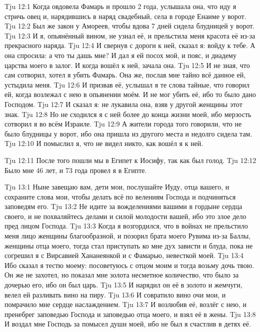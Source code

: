 \vs Tju 12:1
Когда овдовела Фамарь и прошло 2 года, услышала она,
что иду я стричь овец и, нарядившись в наряд свадебный,
села в городе Енаиме у ворот.
\vs Tju 12:2
Был же закон у Амореев, чтобы вдова 7 дней сидела блудницей у ворот.
\vs Tju 12:3
И я, опьянённый вином, не узнал её,
и прельстила меня красота её из-за прекрасного наряда.
\vs Tju 12:4
И свернув с дороги к ней, сказал я: войду к тебе.
А она спросила: а что ты дашь мне?
И дал я ей посох мой, и пояс, и диадему царства моего в залог.
И когда вошёл к ней, зачала она.
\vs Tju 12:5
И не зная, что сам сотворил, хотел я убить Фамарь.
Она же, послав мне тайно всё данное ей, устыдила меня.
\vs Tju 12:6
И призвав её, услышал я те слова тайные, что говорил ей,
когда возлежал с нею в опьянении моём.
И не мог убить её, ибо то было дано Господом.
\vs Tju 12:7
И сказал я: не лукавила она, взяв у другой женщины этот знак.
\vs Tju 12:8
Но не сходился я с ней более до конца жизни моей,
ибо мерзость сотворил я во всём Израиле.
\vs Tju 12:9
А жители города того говорили, что не было блудницы у ворот,
ибо она пришла из другого места и недолго сидела там.
\vs Tju 12:10
И помыслил я, что не видел никто, как вошёл я к ней.

\vs Tju 12:11
После того пошли мы в Египет к Иосифу, так как был голод.
\vs Tju 12:12
Было мне 46 лет, и 73 года провел я в Египте.

\vs Tju 13:1
Ныне завещаю вам, дети мои, послушайте Иуду, отца вашего,
и сохраните слова мои, чтобы делать всё по велениям Господа
и подчиняться заповедям его.
\vs Tju 13:2
Не идите за вожделениями вашими в гордыне сердца своего,
и не похваляйтесь делами и силой молодости вашей,
ибо это злое дело пред лицом Господа.
\vs Tju 13:3
Когда я возгордился, что в войнах не прельстило меня лицо
женщины благообразной, и позорил брата моего Рувима из-за Баллы,
женщины отца моего, тогда стал приступать ко мне дух зависти и блуда,
пока не согрешил я с Вирсавией Хананеянкой и с Фамарью,
невесткой моей.
\vs Tju 13:4
Ибо сказал я тестю моему:
посоветуюсь с отцом моим и тогда возьму дочь твою.
Он же не захотел, но показал мне золота несметное количество,
что было за дочерью его, ибо он был царь.
\vs Tju 13:5
И нарядил он её в золото и жемчуги, велел ей разливать вино на пиру.
\vs Tju 13:6
И совратило вино очи мои, и помрачило мне сердце наслаждением.
\vs Tju 13:7
И возлюбив её, возлёг с нею, и пренебрег заповедью Господа
и заповедью отца моего, и взял её в жены.
\vs Tju 13:8
И воздал мне Господь за помысел души моей, ибо не был я счастлив в детях её.

